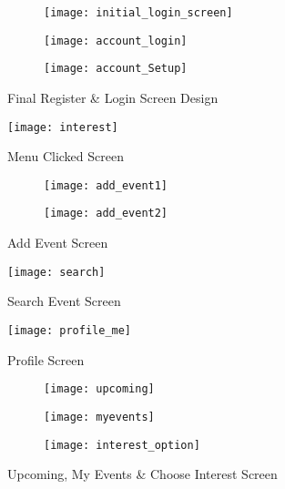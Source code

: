 \begin{appendices}
\begin{figure}[h!]
	\centering
	\begin{subfigure}{0.30\textwidth}  	      
		\texttt{[image: initial\_login\_screen]}
	\end{subfigure}%
	\begin{subfigure}{0.30\textwidth}	
		\texttt{[image: account\_login]}
	\end{subfigure}
	\begin{subfigure}{0.19\textheight}	
		\texttt{[image: account\_Setup]}
	\end{subfigure}
	\caption{Final Register \& Login Screen Design}
\end{figure}

\begin{figure}[h!]
	\centering
	\texttt{[image: interest]}
		\caption{Menu Clicked Screen}
\end{figure}

\begin{figure}[h!]
	\centering
	\begin{subfigure}{0.30\textwidth}  	      
		\texttt{[image: add\_event1]}
	\end{subfigure}%
	\begin{subfigure}{0.30\textwidth}	
		\texttt{[image: add\_event2]}
	\end{subfigure}
	\caption{Add Event Screen}
\end{figure}

\begin{figure}[h!]
	\centering
	\texttt{[image: search]}
	\caption{Search Event Screen}
\end{figure}

\begin{figure}[h!]
	\centering
	\texttt{[image: profile\_me]}
		\caption{Profile Screen}
\end{figure}

\begin{figure}[h!]
	\centering
	\begin{subfigure}{0.30\textwidth}  	      
		\texttt{[image: upcoming]}
	\end{subfigure}%
	\begin{subfigure}{0.30\textwidth}	
		\texttt{[image: myevents]}
	\end{subfigure}
	\begin{subfigure}{0.30\textwidth}  	      
	\texttt{[image: interest\_option]}
\end{subfigure}%
	\caption{Upcoming, My Events \& Choose Interest Screen}
\end{figure}




\end{appendices}
